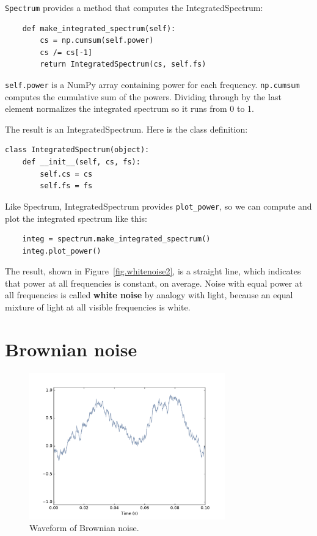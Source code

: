 \documentclass[12pt]{book}
\begin{document}
{\tt Spectrum} provides a method that computes the IntegratedSpectrum:

\begin{verbatim}
    def make_integrated_spectrum(self):
        cs = np.cumsum(self.power)
        cs /= cs[-1]
        return IntegratedSpectrum(cs, self.fs)
\end{verbatim}

{\tt self.power} is a NumPy array containing power for each frequency.
{\tt np.cumsum} computes the cumulative sum of the powers.
Dividing through by the last element normalizes the integrated
spectrum so it runs from 0 to 1.

The result is an IntegratedSpectrum.  Here is the class definition:

\begin{verbatim}
class IntegratedSpectrum(object):
    def __init__(self, cs, fs):
        self.cs = cs
        self.fs = fs
\end{verbatim}

Like Spectrum, IntegratedSpectrum provides \verb"plot_power", so
we can compute and plot the integrated spectrum like this:

\begin{verbatim}
    integ = spectrum.make_integrated_spectrum()
    integ.plot_power()
\end{verbatim}

The result, shown in Figure~\ref{fig.whitenoise2}, is a straight line,
which indicates that power at all frequencies is constant, on average.
Noise with equal power at all frequencies is called {\bf white noise}
by analogy with light, because an equal mixture of light at all
visible frequencies is white.



\section{Brownian noise}
\label{brownian}

\begin{figure}
\centerline{\includegraphics[height=2.5in]{figs/rednoise0.pdf}}
\caption{Waveform of Brownian noise.}
\label{fig.rednoise0}
\end{figure}
\end{document}

